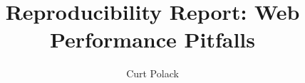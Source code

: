 \usepackage[utf8]{inputenc}
\usepackage{packages}
\usepackage{beamermods}

\author[Curt Polack]{Curt Polack}
\title[Reproducibility Report: Web Performance Pitfalls]{Reproducibility Report: Web Performance Pitfalls}



\date{}




\usepackage{pgfpages}
\usepackage{ifthen}
\newif\ifsolution%

\makeatletter
\let\@@magyar@captionfix\relax
\makeatother
